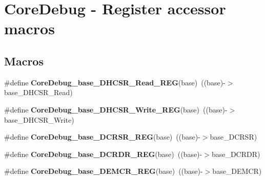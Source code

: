 \hypertarget{group___core_debug___register___accessor___macros}{}\section{Core\+Debug -\/ Register accessor macros}
\label{group___core_debug___register___accessor___macros}
\subsection*{Macros}
\begin{DoxyCompactItemize}
\item 
\mbox{\label{group___core_debug___register___accessor___macros_gac833b7540ffafe000016ddc394a9d147}} 
\#define {\bfseries Core\+Debug\+\_\+base\+\_\+\+D\+H\+C\+S\+R\+\_\+\+Read\+\_\+\+R\+EG}(base)~((base)-\/$>$base\+\_\+\+D\+H\+C\+S\+R\+\_\+\+Read)
\item 
\mbox{\label{group___core_debug___register___accessor___macros_ga47ea32822d2a6f5acea35f2d8859f111}} 
\#define {\bfseries Core\+Debug\+\_\+base\+\_\+\+D\+H\+C\+S\+R\+\_\+\+Write\+\_\+\+R\+EG}(base)~((base)-\/$>$base\+\_\+\+D\+H\+C\+S\+R\+\_\+\+Write)
\item 
\mbox{\label{group___core_debug___register___accessor___macros_ga8b45e5b041ad90bbee03fb1431487fee}} 
\#define {\bfseries Core\+Debug\+\_\+base\+\_\+\+D\+C\+R\+S\+R\+\_\+\+R\+EG}(base)~((base)-\/$>$base\+\_\+\+D\+C\+R\+SR)
\item 
\mbox{\label{group___core_debug___register___accessor___macros_ga3ee2f6e86a62ec00d4a06ecf8b320c5e}} 
\#define {\bfseries Core\+Debug\+\_\+base\+\_\+\+D\+C\+R\+D\+R\+\_\+\+R\+EG}(base)~((base)-\/$>$base\+\_\+\+D\+C\+R\+DR)
\item 
\mbox{\label{group___core_debug___register___accessor___macros_gaa6db4a530be795b1cc9a41b12e98bb10}} 
\#define {\bfseries Core\+Debug\+\_\+base\+\_\+\+D\+E\+M\+C\+R\+\_\+\+R\+EG}(base)~((base)-\/$>$base\+\_\+\+D\+E\+M\+CR)
\item 

\end{DoxyCompactItemize}
